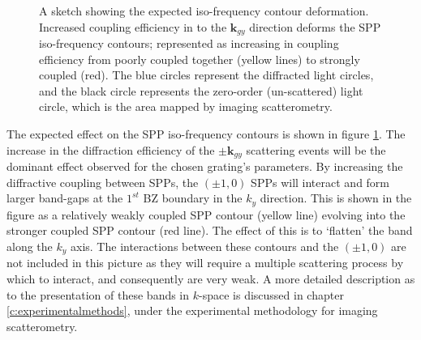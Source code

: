 \begin{figure}
\begin{center}

\end{center}
\caption[A sketch showing the expected iso-frequency contour deformation as $d_2$ is changed.]{A sketch showing the expected iso-frequency contour deformation. Increased coupling efficiency in to the $\mathbf{k}_{gy}$ direction deforms the SPP iso-frequency contours; represented as increasing in coupling efficiency from poorly coupled together (yellow lines) to strongly coupled (red). The blue circles represent the diffracted light circles, and the black circle represents the zero-order (un-scattered) light circle, which is the area mapped by imaging scatterometry.\label{fig:isofreq-deformation-cartoon}}
\end{figure}


The expected effect on the SPP iso-frequency contours is shown in figure \ref{fig:isofreq-deformation-cartoon}. The increase in the diffraction efficiency of the $\pm\mathbf{k}_{gy}$ scattering events will be the dominant effect observed for the chosen grating's parameters. By increasing the diffractive coupling between SPPs, the $(\pm1,0)$ SPPs will interact and form larger band-gaps at the $1^{st}$ BZ boundary in the $k_y$ direction. This is shown in the figure as a relatively weakly coupled SPP contour (yellow line) evolving into the stronger coupled SPP contour (red line). The effect of this is to `flatten' the band along the $k_y$ axis. The interactions between these contours and the $(\pm1,0)$ are not included in this picture as they will require a multiple scattering process by which to interact, and consequently are very weak. A more detailed description as to the presentation of these bands in $k$-space is discussed in chapter \ref{c:experimentalmethods}, under the experimental methodology for imaging scatterometry.


